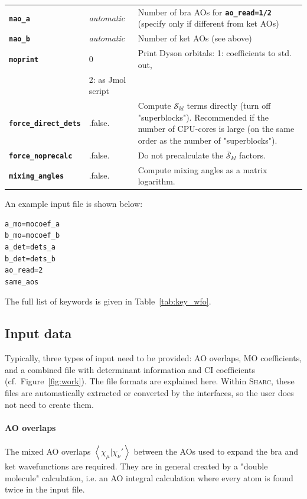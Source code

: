 \documentclass[a4paper,10pt,DIV=15,openany]{scrbook}
\newcommand{\sharc}{\textsc{Sharc}}
\newcommand{\ttt}[1]{\textbf{\texttt{#1}}}
\newenvironment{example}{
  \setlength{\OuterFrameSep}{3pt}
  \vspace{0mm}
  \definecolor{shadecolor}{HTML}{E4F4FF}
  \begin{shaded}
}{
  \end{shaded}
}
\begin{document}
\begin{table}[tb]
\begin{tabular}{llp{9cm}}
    \ttt{nao\_a}                & \textit{automatic}            & Number of bra AOs for \ttt{ao\_read=1/2} (specify only if different from ket AOs) \\
    \ttt{nao\_b}                & \textit{automatic}            & Number of ket AOs (see above)  \\
    \ttt{moprint}               & 0                             & Print Dyson orbitals: 1: coefficients to std. out,\\
                                                                & 2: as Jmol script\\
    \ttt{force\_direct\_dets}   & .false.                       & Compute $\mathcal{S}_{kl}$ terms directly (turn off "superblocks").
                                                                Recommended if the number of CPU-cores is large (on the same order as the number of "superblocks").\\
    \ttt{force\_noprecalc}      & .false.                       & Do not precalculate the $\bar{\mathcal{S}}_{kl}$ factors.\\
    \ttt{mixing\_angles}        & .false.                       & Compute mixing angles as a matrix logarithm.\\
    \hline
  \end{tabular}
\end{table}

An example input file is shown below:
%
\begin{example}
\begin{verbatim}
a_mo=mocoef_a
b_mo=mocoef_b
a_det=dets_a
b_det=dets_b
ao_read=2
same_aos
\end{verbatim}
\end{example}
The full list of keywords is given in Table~\ref{tab:key_wfo}.



\subsection{Input data}
Typically, three types of input need to be provided: AO overlaps, MO coefficients, and a combined file with determinant information and CI coefficients (cf.~Figure~\ref{fig:work}).
The file formats are explained here.
Within \sharc, these files are automatically extracted or converted by the interfaces, so the user does not need to create them.

\paragraph{AO overlaps}
The mixed AO overlaps $\left<\chi_{\mu}|\chi_{\nu}'\right>$ between the AOs used to expand the bra and ket wavefunctions are required.
They are in general created by a "double molecule" calculation, i.e. an AO integral calculation where every atom is found twice in the input file.
\end{document}
